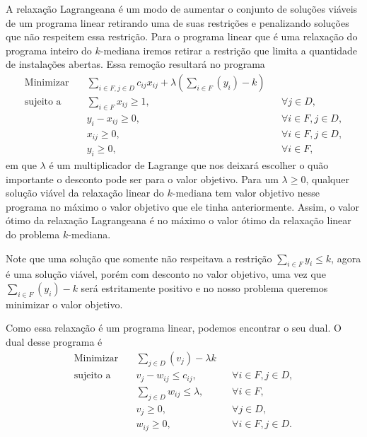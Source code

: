A relaxação Lagrangeana é um modo de aumentar o conjunto de soluções viáveis de um programa linear retirando uma de suas restrições e penalizando soluções que não respeitem essa restrição. Para o programa linear que é uma relaxação do programa inteiro do $k$-mediana iremos retirar a restrição que limita a quantidade de instalações abertas. Essa remoção resultará no programa
\begin{align}
    \text{Minimizar} \quad & \sum_{i \in F, j \in D} c_{ij}x_{ij} + \lambda \left(\sum_{i \in F} (y_i) - k\right) \\
    \text{sujeito a} \quad & \sum_{i \in F} x_{ij} \geq 1, &&\forall j \in D, \\
                           & y_i - x_{ij} \geq 0, &&\forall i \in F, j \in D, \\
                           & x_{ij} \geq 0, && \forall i \in F,j \in D, \\
                           & y_i \geq 0, &&\forall i \in F,
\end{align}
em que $\lambda$ é um multiplicador de Lagrange que nos deixará escolher o quão importante o desconto pode ser para o valor objetivo. Para um $\lambda \geq 0$, qualquer solução viável da relaxação linear do $k$-mediana tem valor objetivo nesse programa no máximo o valor objetivo que ele tinha anteriormente. Assim, o valor ótimo da relaxação Lagrangeana é no máximo o valor ótimo da relaxação linear do problema $k$-mediana.

Note que uma solução que somente não respeitava a restrição $\sum_{i \in F} y_i \leq k$, agora é uma solução viável, porém com desconto no valor objetivo, uma vez que $\sum_{i \in F}(y_i) - k $ será estritamente positivo e no nosso problema queremos minimizar o valor objetivo.

Como essa relaxação é um programa linear, podemos encontrar o seu dual. O dual desse programa é
\begin{align}
    \text{Minimizar} \quad & \sum_{j \in D} (v_j) - \lambda k \\
    \text{sujeito a} \quad & v_j - w_{ij} \leq c_{ij}, &&\forall i \in F, j\in D, \\
                           & \sum_{j\in D} w_{ij} \leq \lambda, &&\forall i \in F, \\
                           & v_j \geq 0, &&\forall j\in D, \\
                           & w_{ij} \geq 0, && \forall i \in F,j \in D.
\end{align}

